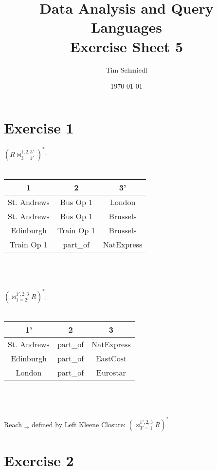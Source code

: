 \documentclass{article}
\begin{document}
\title{Data Analysis and Query Languages \\
 Exercise Sheet 5}
\date{\today}
\author{Tim Schmiedl} 
\maketitle

\section*{Exercise 1}

$(R\bowtie^{1,2,3'}_{3=1'})^*$:\\
\\
\begin{tabular}{|c|c|c|}
\hline
1 & 2 & 3'\\
\hline
St. Andrews & Bus Op 1 & London\\
\hline
St. Andrews & Bus Op 1 & Brussels\\
\hline
Edinburgh & Train Op 1 & Brussels\\
\hline
Train Op 1 & part\_of & NatExpress\\
\hline
\end{tabular}\\
\\
\\
$(\bowtie^{1',2,3}_{1=2'}R)^*$:\\
\\
\begin{tabular}{|c|c|c|}
\hline
1' & 2 & 3\\
\hline
St. Andrews & part\_of & NatExpress\\
\hline
Edinburgh & part\_of & EastCost\\
\hline
London & part\_of & Eurostar\\
\hline
\end{tabular}\\
\\
\\
Reach $_{\to}$ defined by Left Kleene Closure: $(\bowtie^{1',2,3}_{3'=1}R)^*$\\

\vspace{2cm}
\section*{Exercise 2}
\end{document}
